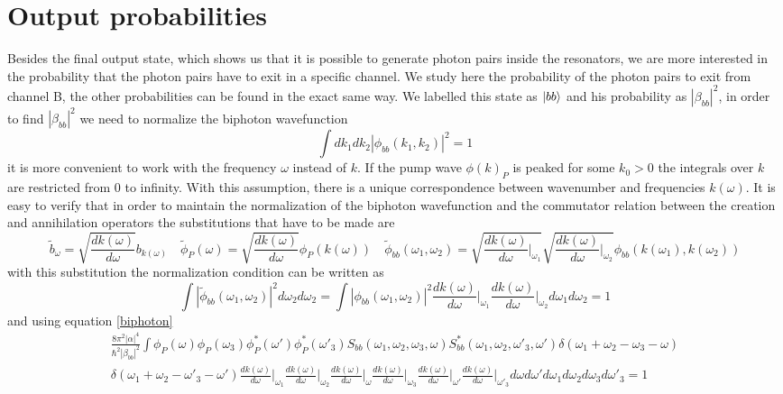\section{Output probabilities}
Besides the final output state, which shows us that it is possible to generate photon pairs inside the resonators, we are more interested in the probability that the photon pairs have to exit in a specific channel. We study here the probability of the photon pairs to exit from channel B, the other probabilities can be found in the exact same way. We labelled this state as $\ket{bb}$ and his probability as $|\beta_{bb}|^2$, in order to find $|\beta_{bb}|^2$ we need to normalize the biphoton wavefunction
\begin{equation}\int dk_1 dk_2 |\phi_{bb}(k_1,k_2)|^2 = 1 \end{equation}
it is more convenient to work with the frequency $\omega$ instead of $k$. If the pump wave $\phi(k)_P$ is peaked for some $k_0>0$ the integrals over $k$ are restricted from 0 to infinity. With this assumption, there is a unique correspondence between wavenumber and frequencies $k(\omega)$. It is easy to verify that in order to maintain the normalization of the biphoton wavefunction and the commutator relation between the creation and annihilation operators the substitutions that have to be made are
\begin{equation}\widetilde{b}_\omega = \sqrt{\frac{dk(\omega)}{d\omega}}b_{k(\omega)} \quad \widetilde{\phi}_P(\omega) = \sqrt{\frac{dk(\omega)}{d\omega}}\phi_P(k(\omega)) \quad \widetilde{\phi}_{bb}(\omega_1,\omega_2) = \sqrt{\frac{dk(\omega)}{d\omega}\Bigg|_{\omega_1}}\sqrt{\frac{dk(\omega)}{d\omega}\Bigg|_{\omega_2}}\phi_{bb}(k(\omega_1),k(\omega_2)) \end{equation}
with this substitution the normalization condition can be written as
\begin{equation}\int |\widetilde{\phi}_{bb}(\omega_1,\omega_2)|^2d\omega_2d\omega_2 = \int |\phi_{bb}(\omega_1,\omega_2)|^2\frac{dk(\omega)}{d\omega}\Bigg|_{\omega_1}\frac{dk(\omega)}{d\omega}\Bigg|_{\omega_2} d\omega_1d\omega_2 = 1\end{equation}
and using equation \eqref{biphoton}
\begin{multline}\frac{8\pi^2|\alpha|^4}{\hbar^2|\beta_{bb}|^2}\int \phi_P(\omega)\phi_P(\omega_3)\phi_P^*(\omega')\phi^*_P(\omega'_{3})S_{bb}(\omega_1,\omega_2,\omega_3,\omega)S^*_{bb}(\omega_1,\omega_2,\omega'_3,\omega')\delta(\omega_1+\omega_2-\omega_{3}-\omega)\\
\delta(\omega_1+\omega_2-\omega'_{3}-\omega')\frac{dk(\omega)}{d\omega}\Bigg|_{\omega_1}\frac{dk(\omega)}{d\omega}\Bigg|_{\omega_2}\frac{dk(\omega)}{d\omega}\Bigg|_{\omega}\frac{dk(\omega)}{d\omega}\Bigg|_{\omega_3}\frac{dk(\omega)}{d\omega}\Bigg|_{\omega'}\frac{dk(\omega)}{d\omega}\Bigg|_{\omega'_3} d\omega d\omega'  d\omega_1d\omega_2d\omega_3 d\omega'_3= 1 \end{multline}

